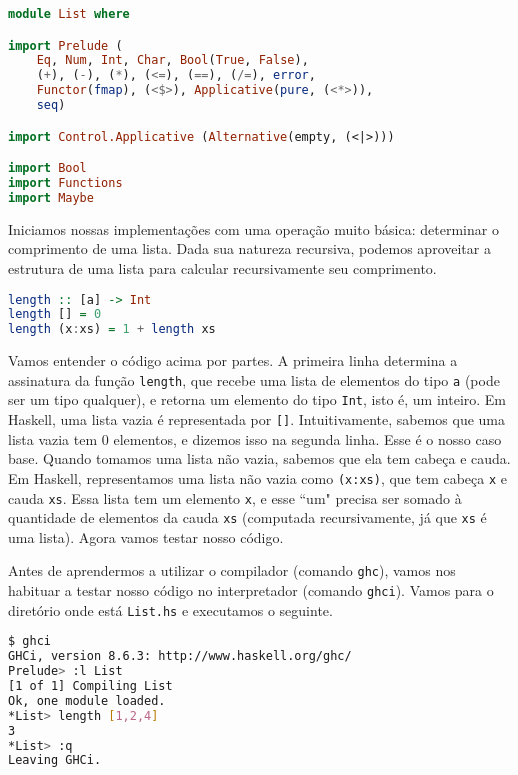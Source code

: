 \documentclass[a4paper]{article}
\begin{document}
\begin{lstlisting}[language=haskell, frame=single]
module List where

import Prelude (
	Eq, Num, Int, Char, Bool(True, False),
	(+), (-), (*), (<=), (==), (/=), error,
	Functor(fmap), (<$>), Applicative(pure, (<*>)),
	seq)

import Control.Applicative (Alternative(empty, (<|>)))

import Bool
import Functions
import Maybe 
\end{lstlisting}

Iniciamos nossas implementações com uma operação muito básica: determinar o comprimento de uma lista.
Dada sua natureza recursiva, podemos aproveitar a estrutura de uma lista para calcular recursivamente seu comprimento.

\begin{lstlisting}[language=haskell, frame=single]
length :: [a] -> Int
length [] = 0
length (x:xs) = 1 + length xs
\end{lstlisting}

Vamos entender o código acima por partes.
A primeira linha determina a assinatura da função \texttt{length}, que recebe uma lista de elementos do tipo \texttt{a} (pode ser um tipo qualquer), e retorna um elemento do tipo \texttt{Int}, isto é, um inteiro.
Em Haskell, uma lista vazia é representada por \texttt{[]}.
Intuitivamente, sabemos que uma lista vazia tem 0 elementos, e dizemos isso na segunda linha.
Esse é o nosso caso base.
Quando tomamos uma lista não vazia, sabemos que ela tem cabeça e cauda.
Em Haskell, representamos uma lista não vazia como \texttt{(x:xs)}, que tem cabeça \texttt{x} e cauda \texttt{xs}.
Essa lista tem um elemento \texttt{x}, e esse ``um" precisa ser somado à quantidade de elementos da cauda \texttt{xs} (computada recursivamente, já que \texttt{xs} é uma lista).
Agora vamos testar nosso código.

Antes de aprendermos a utilizar o compilador (comando \texttt{ghc}), vamos nos habituar a testar nosso código no interpretador (comando \texttt{ghci}).
Vamos para o diretório onde está \texttt{List.hs} e executamos o seguinte.

\pagebreak

\begin{lstlisting}[language=bash, frame=single]
$ ghci                                                                      
GHCi, version 8.6.3: http://www.haskell.org/ghc/                                        
Prelude> :l List                                                                                   
[1 of 1] Compiling List                                                    
Ok, one module loaded.                                                                             
*List> length [1,2,4]                                                                              
3                                                                                                  
*List> :q                                                                                          
Leaving GHCi.               
\end{lstlisting}
\end{document}
